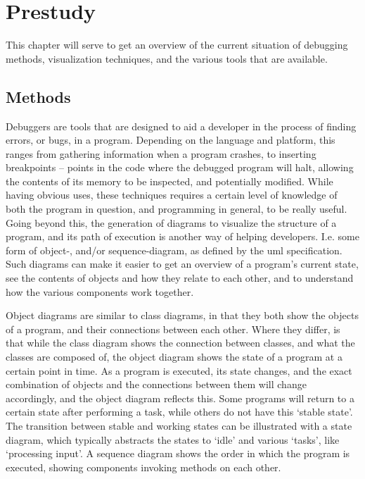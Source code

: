 \chapter{Prestudy}\label{prestudy}%

This chapter will serve to get an overview of the current situation of debugging methods, visualization techniques, and the various tools that are available.

\section{Methods}\label{preMethods}

Debuggers are tools that are designed to aid a developer in the process of finding errors, or bugs, in a program.
Depending on the language and platform, this ranges from gathering information when a program crashes, to inserting \glspl{breakpoint} -- points in the code where the debugged program will halt, allowing the contents of its memory to be inspected, and potentially modified.
While having obvious uses, these techniques requires a certain level of knowledge of both the program in question, and programming in general, to be really useful.
Going beyond this, the generation of diagrams to visualize the structure of a program, and its path of execution is another way of helping developers.
I.e. some form of object-, and/or sequence-diagram, as defined by the \gls{uml} specification.
Such diagrams can make it easier to get an overview of a program's current state, see the contents of objects and how they relate to each other, and to understand how the various components work together.

Object diagrams are similar to class diagrams, in that they both show the objects of a program, and their connections between each other.
Where they differ, is that while the class diagram shows the connection between classes, and what the classes are composed of, the object diagram shows the state of a program at a certain point in time.
As a program is executed, its state changes, and the exact combination of objects and the connections between them will change accordingly, and the object diagram reflects this.
Some programs will return to a certain state after performing a task, while others do not have this `stable state'.
The transition between stable and working states can be illustrated with a state diagram, which typically abstracts the states to `idle' and various `tasks', like `processing input'.
A sequence diagram shows the order in which the program is executed, showing components invoking methods on each other.

